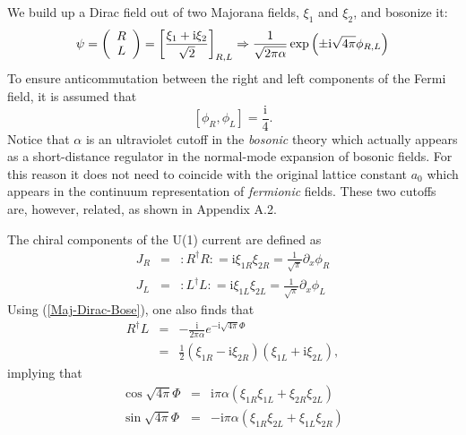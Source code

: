 We build up a Dirac field out of two Majorana fields, $\xi_1$ and
$\xi_2$, and bosonize it:
\begin{equation}
\psi = \left(
\begin{array}{clcr}
R\\
L
\end{array}
\right)
= \left[ \frac{\xi_1 + \mbox{i} \xi_2}{\sqrt{2}} \right]_{R,L} \Rightarrow
\frac{1}{\sqrt{2\pi \alpha}}
\exp \left( \pm \mbox{i} \sqrt{4\pi}\phi_{R,L} \right)
\label{Maj-Dirac-Bose}
\end{equation}
To ensure anticommutation between the right and left components of the Fermi
field,
it is assumed that
\begin{equation}
\left[\phi_R , \phi_L \right] = \frac{\mbox{i}}{4}.\label{RL-comm}
\end{equation}
Notice that $\alpha$ is an ultraviolet cutoff in the {\sl bosonic} theory which
actually appears as a short-distance regulator in the normal-mode expansion of
bosonic fields. For this reason it does not need to coincide with the original
lattice
constant $a_0$ which appears in the continuum representation of {\sl fermionic}
fields. These two cutoffs are, however, related, as shown in Appendix A.2.

The chiral components of the U(1) current
are defined as
\begin{eqnarray}
J_{R} &=& :R^{\dagger} R: = \mbox{i} \xi_{1R} \xi_{2R}
= \frac{1}{\sqrt{\pi}} \partial_x \phi_R \label{cur-R}\\
J_L &=& :L^{\dagger}L: = \mbox{i} \xi_{1L} \xi_{2L}
= \frac{1}{\sqrt{\pi}} \partial_x \phi_L
\label{cur-L}
\end{eqnarray}
Using (\ref{Maj-Dirac-Bose}), one also finds that
\begin{eqnarray}
R^{\dagger}L &=& - \frac{\mbox{i}}{2\pi \alpha} e^{- \mbox{i} \sqrt{4\pi} \Phi}
\nonumber\\
&=& \frac{1}{2} \left(\xi_{1R} - \mbox{i} \xi_{2R} \right)
\left(\xi_{1L} + \mbox{i} \xi_{2L} \right), \label{R^+-L}
\end{eqnarray}
implying that
\begin{eqnarray}
\cos \sqrt{4\pi} \Phi &=& \mbox{i} \pi \alpha
\left(\xi_{1R} \xi_{1L} + \xi_{2R} \xi_{2L} \right) \label{cos-Maj}\\
\sin \sqrt{4\pi} \Phi &=& - \mbox{i} \pi \alpha
\left(\xi_{1R} \xi_{2L} + \xi_{1L} \xi_{2R} \right)
\label{sin-Maj}
\end{eqnarray}

